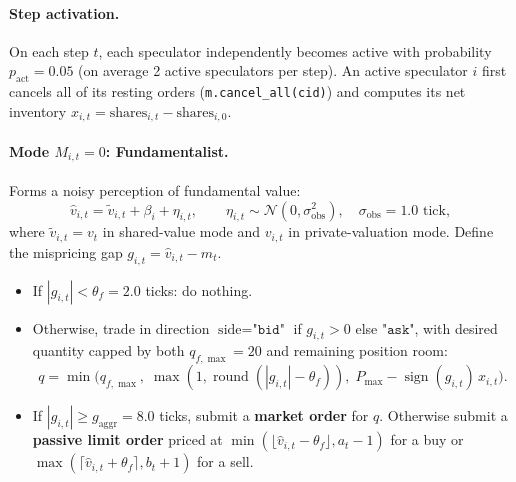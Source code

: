 \documentclass[11pt,a4paper]{article}
\newcommand{\code}[1]{\texttt{#1}}
\newcommand{\sign}{\operatorname{sign}}
\begin{document}
\paragraph{Step activation.} On each step $t$, each speculator independently becomes active with
probability $p_{\text{act}} = 0.05$ (on average 2 active speculators per step). An active speculator $i$
first cancels all of its resting orders (\code{m.cancel\_all(cid)}) and computes its net inventory
$x_{i,t} = \text{shares}_{i,t} - \text{shares}_{i,0}$.

\paragraph{Mode $M_{i,t} = 0$: Fundamentalist.} Forms a noisy perception of fundamental value:
\begin{equation}
  \hat v_{i,t} = \tilde v_{i,t} + \beta_i + \eta_{i,t}, \qquad \eta_{i,t} \sim \mathcal{N}(0, \sigma_{\text{obs}}^2),
  \quad \sigma_{\text{obs}} = 1.0\text{ tick},
\end{equation}
where $\tilde v_{i,t} = v_t$ in shared-value mode and $v_{i,t}$ in private-valuation mode. Define the
mispricing gap $g_{i,t} = \hat v_{i,t} - m_t$.
\begin{itemize}[nosep]
\item If $|g_{i,t}| < \theta_f = 2.0$ ticks: do nothing.
\item Otherwise, trade in direction $\text{side} = \code{"bid"}$ if $g_{i,t} > 0$ else $\code{"ask"}$,
  with desired quantity capped by both $q_{f,\max} = 20$ and remaining position room:
  \begin{equation}
    q = \min\!\big(q_{f,\max},\; \max(1, \operatorname{round}(|g_{i,t}| - \theta_f)),\;
    P_{\max} - \sign(g_{i,t})\,x_{i,t}\big).
  \end{equation}
\item If $|g_{i,t}| \ge g_{\text{aggr}} = 8.0$ ticks, submit a \textbf{market order} for $q$. Otherwise
  submit a \textbf{passive limit order} priced at $\min(\lfloor \hat v_{i,t} - \theta_f \rfloor, a_t - 1)$
  for a buy or $\max(\lceil \hat v_{i,t} + \theta_f \rceil, b_t + 1)$ for a sell.
\end{itemize}
\end{document}

